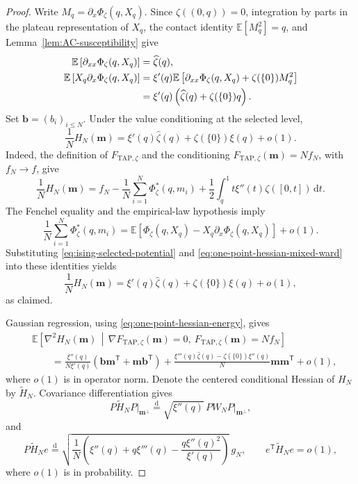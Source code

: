 \documentclass[a4paper,10pt,reqno]{amsart}
\numberwithin{equation}{section}
\newcommand{\dE}{\mathbb{E}}%
\newcommand{\dd}{\mathrm{d}}
\newcommand{\TAP}{\mathrm{TAP}}
\newcommand{\bfm}{\mathbf{m}}
\newcommand{\bfb}{\mathbf{b}}
\begin{document}
	\begin{proof}
		Write \(M_q=\partial_x\Phi_\zeta(q,X_q)\). Since
		\(\zeta((0,q))=0\), integration by parts in the plateau
		representation of \(X_q\), the contact identity
		\(\dE[M_q^2]=q\), and
		Lemma~\ref{lem:AC-susceptibility} give
		\begin{align}
			\dE\left[\partial_{xx}\Phi_\zeta(q,X_q)\right]
			&=\widehat\zeta(q),
			\label{eq:one-point-hessian-susceptibility}\\
			\dE\left[X_q\partial_x\Phi_\zeta(q,X_q)\right]
			&=\xi'(q)\dE\left[
			\partial_{xx}\Phi_\zeta(q,X_q)
			+\zeta(\{0\})M_q^2
			\right]\notag\\
			&=\xi'(q)\left(
			\widehat\zeta(q)+\zeta(\{0\})q
			\right).
			\label{eq:one-point-hessian-mixed-ward}
		\end{align}
		Set \(\bfb=(b_i)_{i\le N}\).
		Under the value conditioning at the selected level,
		\begin{equation}\label{eq:one-point-hessian-energy}
			\frac1N H_N(\bfm)
			=
			\xi'(q)\widehat\zeta(q)+\zeta(\{0\})\xi(q)+o(1).
		\end{equation}
		Indeed, the definition of \(F_{\TAP,\zeta}\) and the conditioning
		\(F_{\TAP,\zeta}(\bfm)=Nf_N\), with \(f_N\to f\), give
		\[
		\frac1N H_N(\bfm)
		=
		f_N-\frac1N\sum_{i=1}^N\Phi_\zeta^*(q,m_i)
		+\frac12\int_q^1t\xi''(t)\zeta([0,t])\,\dd t.
		\]
		The Fenchel equality and the empirical-law hypothesis imply
		\[
		\frac1N\sum_{i=1}^N\Phi_\zeta^*(q,m_i)
		=
		\dE\left[
		\Phi_\zeta(q,X_q)
		-X_q\partial_x\Phi_\zeta(q,X_q)
		\right]+o(1).
		\]
		Substituting \eqref{eq:ising-selected-potential} and
		\eqref{eq:one-point-hessian-mixed-ward} into these identities yields
		\[
		\frac1N H_N(\bfm)
		=
		\xi'(q)\widehat\zeta(q)
		+\zeta(\{0\})\xi(q)+o(1),
		\]
		as claimed.
		
		Gaussian regression, using \eqref{eq:one-point-hessian-energy}, gives
		\[
		\begin{aligned}
			&\dE\left[
			\nabla^2H_N(\bfm)
			\,\middle|\,
			\nabla F_{\TAP,\zeta}(\bfm)=0,
			\ F_{\TAP,\zeta}(\bfm)=Nf_N
			\right]\\
			&\qquad=
			\frac{\xi''(q)}{N\xi'(q)}
			\left(\bfb\bfm^{\mathsf T}+\bfm\bfb^{\mathsf T}\right)
			+\frac{
				\xi'''(q)\widehat\zeta(q)
				-\zeta(\{0\})\xi''(q)
			}{N}\bfm\bfm^{\mathsf T}
			+o(1),
		\end{aligned}
		\]
		where \(o(1)\) is in operator norm. Denote the centered conditional
		Hessian of \(H_N\) by \(\widetilde H_N\). Covariance differentiation
		gives
		\[
		P\widetilde H_NP\big|_{\bfm^\perp}
		\stackrel{\mathrm d}=
		\sqrt{\xi''(q)}\,PW_NP\big|_{\bfm^\perp},
		\]
		and
		\[
		P\widetilde H_Ne
		\stackrel{\mathrm d}=
		\sqrt{\frac1N\left(
			\xi''(q)+q\xi'''(q)
			-\frac{q\xi''(q)^2}{\xi'(q)}
			\right)}\,g_N,
		\qquad
		e^{\mathsf T}\widetilde H_Ne=o(1),
		\]
		where \(o(1)\) is in probability.
		

\end{proof}
\end{document}
